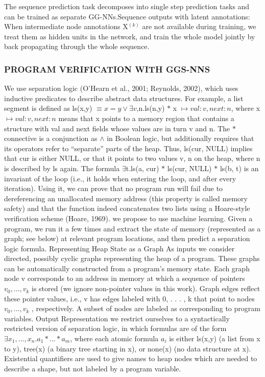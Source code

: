\documentclass{article}
\begin{document}
The sequence prediction task decomposes into single step prediction tasks and can be trained as separate GG-NNs.Sequence outputs with latent annotations: When intermediate node annotations X$^{(k)}$ are not available during training, we treat them as hidden units in the network, and train the whole model jointly by back propagating through the whole sequence.
\subsubsection{PROGRAM VERIFICATION WITH GGS-NNS}
We use separation logic (O’Hearn et al., 2001; Reynolds, 2002), which uses inductive predicates to describe abstract data structures. For example, a list segment is defined as ls(x,y) $\equiv x = y \lor \exists v$,n.ls(n,y) $\ast$ x $\mapsto {val : v,next : n}$, where x $\mapsto {val : v,next : n}$ means that x points to a memory region that contains a structure with val and next fields whose values are in turn v and n. The $\ast$ connective is a conjunction as $\wedge$ in Boolean logic, but additionally requires that its operators refer to “separate” parts of the heap. Thus, ls(cur, NULL) implies that cur is either NULL, or that it points to two values v, n on the heap, where n is described by ls again. The formula $\exists$t.ls(a, cur) $\ast$ ls(cur, NULL) $\ast$ ls(b, t) is an invariant of the loop (i.e., it holds when entering the loop, and after every iteration). Using it, we can prove that no program run will fail due to dereferencing an unallocated memory address (this property is called memory safety) and that the function indeed concatenates two lists using a Hoare-style verification scheme (Hoare, 1969). we propose to use machine learning. Given a program, we run it a few times and extract the state of memory (represented as a graph; see below) at relevant program locations, and then predict a separation logic formula. Representing Heap State as a Graph As inputs we consider directed, possibly cyclic graphs representing the heap of a program. These graphs can be automatically constructed from a program’s memory state. Each graph node v corresponds to an address in memory at which a sequence of pointers $v_0 , . . . , v_k$ is stored (we ignore non-pointer values in this work). Graph edges reflect these pointer values, i.e., v has edges labeled with 0, . . . , k that point to nodes $v_0 , . . . , v_k$ , respectively. A subset of nodes are labeled as corresponding to program variables. Output Representation we restrict ourselves to a syntactically restricted version of separation logic, in which formulas are of the form $\exists x_1,...,x_n.a_1 \ast...\ast a_m$, where each atomic formula $a_i$ is either ls(x,y) (a list from x to y), tree(x) (a binary tree starting in x), or none(x) (no data structure at x). Existential quantifiers are used to give names to heap nodes which are needed to describe a shape, but not labeled by a program variable. 
\end{document}
